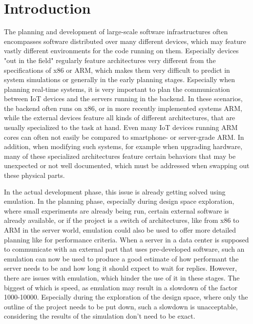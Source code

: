 
\chapter{Introduction}\label{chap:introduction}
The planning and development of large-scale software infrastructures often encompasses software distributed over many different devices,
which may feature vastly different environments for the code running on them.
Especially devices "out in the field" regularly feature architectures very different from the specifications of x86 or ARM,
which makes them very difficult to predict in system simulations or generally in the early planning stages.
Especially when planning real-time systems,
it is very important to plan the communication between IoT devices and the servers running in the backend.
In these scenarios, the backend often runs on x86, or in more recently implemented systems ARM,
while the external devices feature all kinds of different architectures,
that are usually specialized to the task at hand.
Even many IoT devices running ARM cores can often not easily be compared to smartphone- or server-grade ARM.
In addition, when modifying such systems, for example when upgrading hardware,
many of these specialized architectures feature certain behaviors that may be unexpected or not well documented,
which must be addressed when swapping out these physical parts.

In the actual development phase, this issue is already getting solved using emulation.
In the planning phase, especially during design space exploration, where small experiments are already being run,
certain external software is already available, or if the project is a switch of architectures,
like from x86 to ARM in the server world,
emulation could also be used to offer more detailed planning
like for performance criteria.
When a server in a data center is supposed to communicate with an external part that uses pre-developed software,
such an emulation can now be used to produce a good estimate of how performant the server needs to be and how long it should expect to wait for replies.
However, there are issues with emulation, which hinder the use of it in these stages.
The biggest of which is speed, as emulation may result in a slowdown of the factor 1000-10000\cite{slowdown}.
Especially during the exploration of the design space, where only the outline of the project needs to be put down,
such a slowdown is unacceptable, considering the results of the simulation don't need to be exact.


